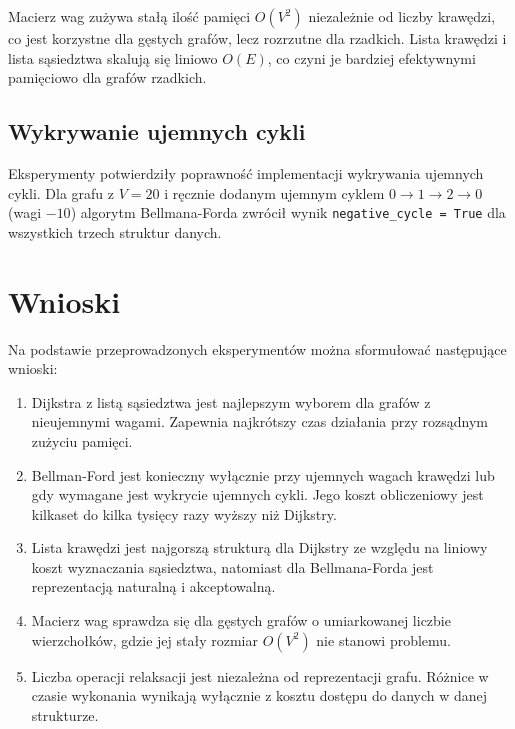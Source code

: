 \documentclass[12pt,a4paper]{article}
\begin{document}
Macierz wag zużywa stałą ilość pamięci $O(V^2)$ niezależnie od liczby krawędzi, co jest korzystne dla gęstych grafów, lecz rozrzutne dla rzadkich. Lista krawędzi i lista sąsiedztwa skalują się liniowo $O(E)$, co czyni je bardziej efektywnymi pamięciowo dla grafów rzadkich.

\subsection{Wykrywanie ujemnych cykli}

Eksperymenty potwierdziły poprawność implementacji wykrywania ujemnych cykli. Dla grafu z $V = 20$ i ręcznie dodanym ujemnym cyklem $0 \to 1 \to 2 \to 0$ (wagi $-10$) algorytm Bellmana-Forda zwrócił wynik \texttt{negative\_cycle = True} dla wszystkich trzech struktur danych.

\section{Wnioski}

Na podstawie przeprowadzonych eksperymentów można sformułować następujące wnioski:

\begin{enumerate}
    \item Dijkstra z listą sąsiedztwa jest najlepszym wyborem dla grafów z nieujemnymi wagami. Zapewnia najkrótszy czas działania przy rozsądnym zużyciu pamięci.
    \item Bellman-Ford jest konieczny wyłącznie przy ujemnych wagach krawędzi lub gdy wymagane jest wykrycie ujemnych cykli. Jego koszt obliczeniowy jest kilkaset do kilka tysięcy razy wyższy niż Dijkstry.
    \item Lista krawędzi jest najgorszą strukturą dla Dijkstry ze względu na liniowy koszt wyznaczania sąsiedztwa, natomiast dla Bellmana-Forda jest reprezentacją naturalną i akceptowalną.
    \item Macierz wag sprawdza się dla gęstych grafów o umiarkowanej liczbie wierzchołków, gdzie jej stały rozmiar $O(V^2)$ nie stanowi problemu.
    \item Liczba operacji relaksacji jest niezależna od reprezentacji grafu. Różnice w czasie wykonania wynikają wyłącznie z kosztu dostępu do danych w danej strukturze.
\end{enumerate}
\end{document}
